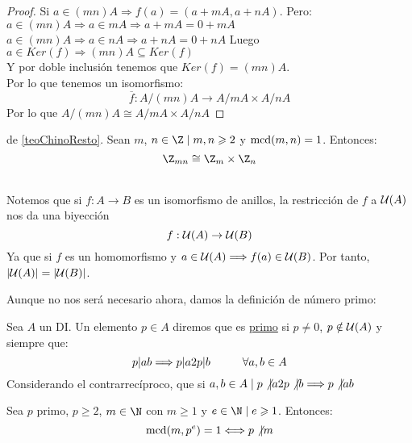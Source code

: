 \begin{teo}
\begin{proof}
    \bigskip
    
    Si $a \in (mn)A \Longrightarrow f(a) = (a+mA, a+nA)$. Pero:\newline
    $a \in (mn)A \Longrightarrow a \in mA \Longrightarrow a+mA = 0+mA$\newline
    $a \in (mn)A \Longrightarrow a\in nA \Longrightarrow a+nA = 0+nA$\newline
    Luego $a \in Ker(f) \Longrightarrow (mn)A \subseteq Ker(f)$\\

    
    Y por doble inclusión tenemos que $Ker(f) = (mn)A$.\\

    
    Por lo que tenemos un isomorfismo:
    $$\overline{f}:A/(mn)A\rightarrow A/mA\times A/nA$$
    Por lo que $A/(mn)A \cong A/mA\times A/nA$
\end{proof}
\end{teo}


\begin{coro}
    de \ref{teoChinoResto}.\newline
    Sean $m$, $n \in \Z \mid m,n \geq 2$ y $\operatorname{mcd}(m,n) = 1$. Entonces:
    $$\Z_{mn} \cong \Z_m \times \Z_n$$
\end{coro}~\\

Notemos que si $f:A\rightarrow B$ es un isomorfismo de anillos, la restricción de $f$ a $\mathcal{U}(A)$ nos da una biyección
$$f:\mathcal{U}(A)\rightarrow \mathcal{U}(B)$$
Ya que si $f$ es un homomorfismo y $a \in \mathcal{U}(A) \Longrightarrow f(a) \in \mathcal{U}(B)$.\newline
Por tanto, $|\mathcal{U}(A)| = |\mathcal{U}(B)|$.

\bigskip

Aunque no nos será necesario ahora, damos la definición de número primo:
\begin{definicion}[Primo]
    \label{defPrimo}
    Sea $A$ un DI. Un elemento $p \in A$ diremos que es \underline{primo} si $p \neq 0$, $p \notin \mathcal{U}(A)$ y siempre que:
    $$p|ab \Longrightarrow p|a 2 p|b\hspace{1cm}\forall a,b \in A$$
    Considerando el contrarrecíproco, que si $a,b \in A \mid p\not|a 2 p\not|b \Longrightarrow p\not|ab$
\end{definicion}

\begin{lema}
    \label{lemaParaPropEuler}
    Sea $p$ primo, $p\geq 2$, $m \in \N$ con $m \geq 1$ y $e \in \N \mid e \geq 1$. Entonces:
    $$\operatorname{mcd}(m,p^e) = 1 \Longleftrightarrow p\not|m$$
\end{lema}

